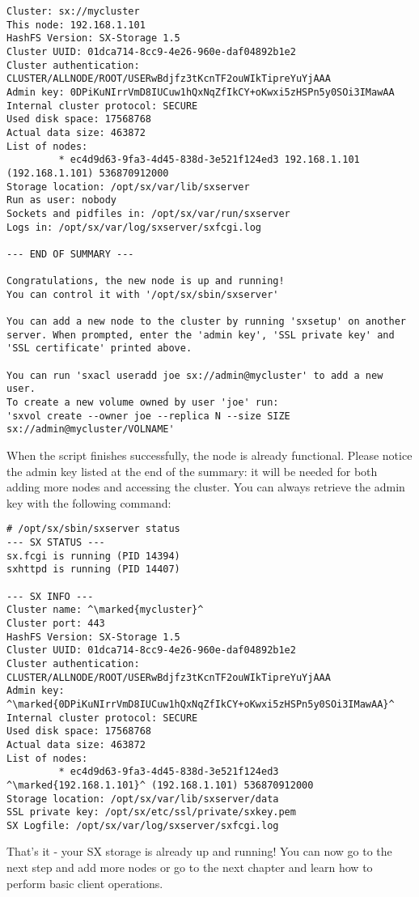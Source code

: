 \begin{lstlisting}
Cluster: sx://mycluster
This node: 192.168.1.101
HashFS Version: SX-Storage 1.5
Cluster UUID: 01dca714-8cc9-4e26-960e-daf04892b1e2
Cluster authentication:
CLUSTER/ALLNODE/ROOT/USERwBdjfz3tKcnTF2ouWIkTipreYuYjAAA
Admin key: 0DPiKuNIrrVmD8IUCuw1hQxNqZfIkCY+oKwxi5zHSPn5y0SOi3IMawAA
Internal cluster protocol: SECURE
Used disk space: 17568768
Actual data size: 463872
List of nodes:
         * ec4d9d63-9fa3-4d45-838d-3e521f124ed3 192.168.1.101 (192.168.1.101) 536870912000
Storage location: /opt/sx/var/lib/sxserver
Run as user: nobody
Sockets and pidfiles in: /opt/sx/var/run/sxserver
Logs in: /opt/sx/var/log/sxserver/sxfcgi.log

--- END OF SUMMARY ---

Congratulations, the new node is up and running!
You can control it with '/opt/sx/sbin/sxserver'

You can add a new node to the cluster by running 'sxsetup' on another
server. When prompted, enter the 'admin key', 'SSL private key' and
'SSL certificate' printed above.

You can run 'sxacl useradd joe sx://admin@mycluster' to add a new user.
To create a new volume owned by user 'joe' run:
'sxvol create --owner joe --replica N --size SIZE sx://admin@mycluster/VOLNAME'
\end{lstlisting}
\LARGE
When the script finishes successfully, the node is already functional.
Please notice the admin key listed at the end of the summary: it will be
needed for both adding more nodes and accessing the cluster. You can
always retrieve the admin key with the following command:
\small
\begin{lstlisting}
# /opt/sx/sbin/sxserver status
--- SX STATUS ---
sx.fcgi is running (PID 14394)
sxhttpd is running (PID 14407)

--- SX INFO ---
Cluster name: ^\marked{mycluster}^
Cluster port: 443
HashFS Version: SX-Storage 1.5
Cluster UUID: 01dca714-8cc9-4e26-960e-daf04892b1e2
Cluster authentication: CLUSTER/ALLNODE/ROOT/USERwBdjfz3tKcnTF2ouWIkTipreYuYjAAA
Admin key: ^\marked{0DPiKuNIrrVmD8IUCuw1hQxNqZfIkCY+oKwxi5zHSPn5y0SOi3IMawAA}^
Internal cluster protocol: SECURE
Used disk space: 17568768
Actual data size: 463872
List of nodes:
         * ec4d9d63-9fa3-4d45-838d-3e521f124ed3 ^\marked{192.168.1.101}^ (192.168.1.101) 536870912000
Storage location: /opt/sx/var/lib/sxserver/data
SSL private key: /opt/sx/etc/ssl/private/sxkey.pem
SX Logfile: /opt/sx/var/log/sxserver/sxfcgi.log
\end{lstlisting}
\LARGE
That's it - your SX storage is already up and running! You can now
go to the next step and add more nodes or go to the next chapter and
learn how to perform basic client operations.


